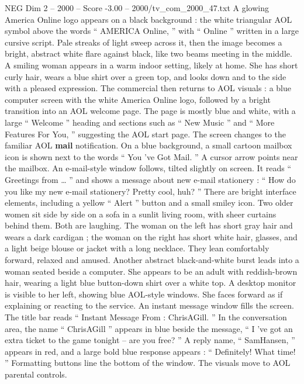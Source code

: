 \begin{textsample}{NEG Dim 2 – 2000 – Score -3.00 – 2000/tv\_com\_2000\_47.txt}  \label{ex:f2_neg_072}
A glowing America Online logo appears on a black background : the white triangular AOL symbol above the words “ AMERICA Online, ” with “ Online ” written in a large cursive script.
Pale streaks of light sweep across it, then the image becomes a bright, abstract white flare against black, like two beams meeting in the middle.
A smiling woman appears in a warm indoor setting, likely at home.
She has short curly hair, wears a blue shirt over a green top, and looks down and to the side with a pleased expression.
The commercial then returns to AOL visuals : a blue computer screen with the white America Online logo, followed by a bright transition into an AOL welcome page.
The page is mostly blue and white, with a large “ Welcome ” heading and sections such as “ New Music ” and “ More Features For You, ” suggesting the AOL start page.
The screen changes to the familiar AOL \textbf{mail} notification.
On a blue background, a small cartoon mailbox icon is shown next to the words “ You ’ve Got Mail. ” A cursor arrow points near the mailbox.
An e-mail-style window follows, tilted slightly on screen.
It reads “ Greetings from … ” and shows a message about new e-mail stationery : “ How do you like my new e-mail stationery?
Pretty cool, huh? ” There are bright interface elements, including a yellow “ Alert ” button and a small smiley icon.
Two older women sit side by side on a sofa in a sunlit living room, with sheer curtains behind them.
Both are laughing.
The woman on the left has short gray hair and wears a dark cardigan ; the woman on the right has short white hair, glasses, and a light beige blouse or jacket with a long necklace.
They lean comfortably forward, relaxed and amused.
Another abstract black-and-white burst leads into a woman seated beside a computer.
She appears to be an adult with reddish-brown hair, wearing a light blue button-down shirt over a white top.
A desktop monitor is visible to her left, showing blue AOL-style windows.
She faces forward as if explaining or reacting to the service.
An instant message window fills the screen.
The title bar reads “ Instant Message From : ChrisAGill. ” In the conversation area, the name “ ChrisAGill ” appears in blue beside the message, “ I ’ve got an extra ticket to the game tonight -- are you free? ” A reply name, “ SamHansen, ” appears in red, and a large bold blue response appears : “ Definitely!
What time! ” Formatting buttons line the bottom of the window.
The visuals move to AOL parental controls.

\end{textsample}

